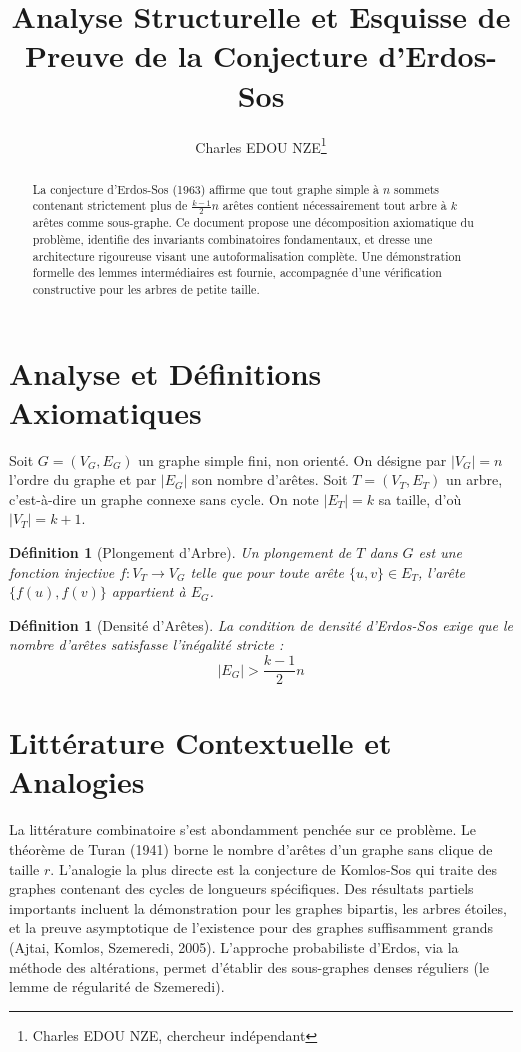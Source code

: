 \documentclass[12pt,a4paper]{article}
\title{Analyse Structurelle et Esquisse de Preuve de la Conjecture d'Erdos-Sos}
\author{Charles EDOU NZE\thanks{Charles EDOU NZE, chercheur indépendant}}
\date{}
\newtheorem{definition}[theorem]{Définition}
\begin{document}
\maketitle

\begin{abstract}
La conjecture d'Erdos-Sos (1963) affirme que tout graphe simple à $n$ sommets contenant strictement plus de $\frac{k-1}{2}n$ arêtes contient nécessairement tout arbre à $k$ arêtes comme sous-graphe. Ce document propose une décomposition axiomatique du problème, identifie des invariants combinatoires fondamentaux, et dresse une architecture rigoureuse visant une autoformalisation complète. Une démonstration formelle des lemmes intermédiaires est fournie, accompagnée d'une vérification constructive pour les arbres de petite taille.
\end{abstract}

\tableofcontents

\section{Analyse et Définitions Axiomatiques}

Soit $G = (V_G, E_G)$ un graphe simple fini, non orienté. On désigne par $|V_G| = n$ l'ordre du graphe et par $|E_G|$ son nombre d'arêtes.
Soit $T = (V_T, E_T)$ un arbre, c'est-à-dire un graphe connexe sans cycle. On note $|E_T| = k$ sa taille, d'où $|V_T| = k+1$.

\begin{definition}[Plongement d'Arbre]
Un plongement de $T$ dans $G$ est une fonction injective $f : V_T \to V_G$ telle que pour toute arête $\{u, v\} \in E_T$, l'arête $\{f(u), f(v)\}$ appartient à $E_G$.
\end{definition}

\begin{definition}[Densité d'Arêtes]
La condition de densité d'Erdos-Sos exige que le nombre d'arêtes satisfasse l'inégalité stricte :
$$ |E_G| > \frac{k-1}{2} n $$
\end{definition}

\section{Littérature Contextuelle et Analogies}

La littérature combinatoire s'est abondamment penchée sur ce problème. Le théorème de Turan (1941) borne le nombre d'arêtes d'un graphe sans clique de taille $r$. L'analogie la plus directe est la conjecture de Komlos-Sos qui traite des graphes contenant des cycles de longueurs spécifiques.
Des résultats partiels importants incluent la démonstration pour les graphes bipartis, les arbres étoiles, et la preuve asymptotique de l'existence pour des graphes suffisamment grands (Ajtai, Komlos, Szemeredi, 2005). L'approche probabiliste d'Erdos, via la méthode des altérations, permet d'établir des sous-graphes denses réguliers (le lemme de régularité de Szemeredi).
\end{document}

